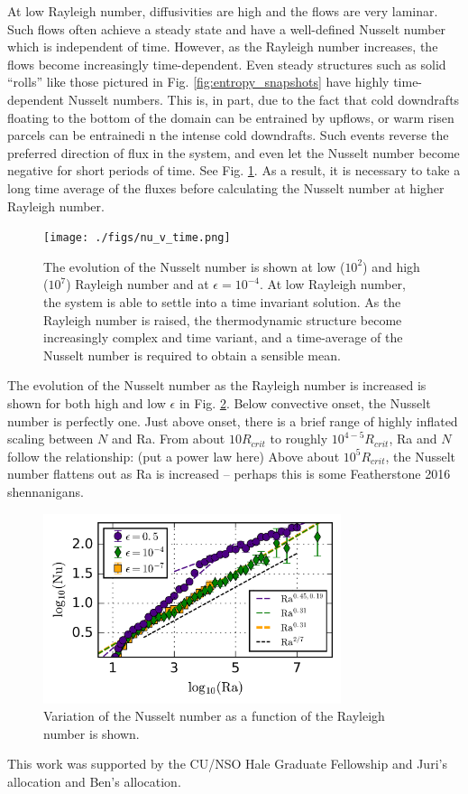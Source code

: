 \documentclass[aps, prl, twocolumn, groupedaddress]{revtex4-1}
\begin{document}
At low Rayleigh number, diffusivities are high and the flows are very laminar.  Such flows often achieve a
steady state and have a well-defined Nusselt number which is independent of time.  However, as the Rayleigh
number increases, the flows become increasingly time-dependent.  Even steady structures such as solid
``rolls'' like those pictured in Fig. \ref{fig:entropy_snapshots} have highly time-dependent Nusselt numbers.
This is, in part, due to the fact that cold downdrafts floating to the bottom of the domain can be entrained
by upflows, or warm risen parcels can be entrainedi n the intense cold downdrafts.  Such events reverse the
preferred direction of flux in the system, and even let the Nusselt number become negative for short periods of
time.  See Fig. \ref{fig:nu_v_time}.  As a result, it is necessary to take a long time average of the fluxes
before calculating the Nusselt number at higher Rayleigh number.


\begin{figure}[t]
\texttt{[image: ./figs/nu\_v\_time.png]}
\caption{The evolution of the Nusselt number is shown at low ($10^2$) and high ($10^7$) Rayleigh number and at
$\epsilon = 10^{-4}$.  At low Rayleigh number, the system is able to settle into a time invariant solution. As
the Rayleigh number is raised, the thermodynamic structure become increasingly complex and time variant, and a
time-average of the Nusselt number is required to obtain a sensible mean.
\label{fig:nu_v_time} }
\end{figure}

The evolution of the Nusselt number as the Rayleigh number is increased is shown for both high and low
$\epsilon$ in Fig. \ref{fig:nu_v_ra}.  Below convective onset, the Nusselt number is perfectly one. Just above
onset, there is a brief range of highly inflated scaling between $N$ and Ra.  From about $10R_{crit}$ to roughly
$10^{4-5}R_{crit}$, Ra and $N$ follow the relationship: (put a power law here)  Above about
$10^5 R_{crit}$, the Nusselt number flattens out as Ra is increased -- perhaps this is some Featherstone 2016
shennanigans.

\begin{figure}[b]
\includegraphics[width=3.4375in]{./figs/nu_v_ra.png}
\caption{Variation of the Nusselt number as a function of the Rayleigh number is shown.
\label{fig:nu_v_ra} }
\end{figure}




\begin{acknowledgements}
This work was supported by the CU/NSO Hale Graduate Fellowship and Juri's allocation and Ben's allocation.
\end{acknowledgements}


\end{document}
